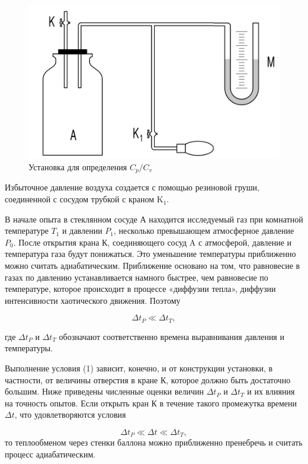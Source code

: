 \documentclass[a4paper,12pt]{article} %
\begin{document}
	\begin{figure}[h!]
		\centering
		\includegraphics[scale = 0.4]{Pictures/Установка.png}
		\caption{Установка для определения $C_{p}/C_{v}$}
	\end{figure}

	
Избыточное давление воздуха создается с помощью резиновой груши, соединенной с сосудом трубкой с краном $\text{K}_{1}$.
	

В начале опыта в стеклянном сосуде А находится исследуемый газ при комнатной температуре $T_{1}$ и давлении $P_{1}$, несколько превышающем атмосферное давление $P_{0}$. После открытия крана К, соединяющего сосуд A с атмосферой, давление и температура газа будут понижаться. Это уменьшение температуры приближенно можно считать адиабатическим. Приближение основано на том, что равновесие в газах по давлению устанавливается намного быстрее, чем равновесие по температуре, которое происходит в процессе «диффузии тепла», диффузии интенсивности хаотического движения. Поэтому
	
	\begin{equation}
		\Delta t_{P} \ll \Delta t_{T},
	\end{equation}

\noindent	где $\Delta t_{P}$ и $\Delta t_{T}$ обозначают соответственно времена выравнивания давления и температуры.

	
 Выполнение условия (1) зависит, конечно, и от конструкции установки, в частности, от величины отверстия в кране К, которое должно быть достаточно большим. Ниже приведены численные оценки величин $\Delta t_{P}$ и $\Delta t_{T}$ и их влияния на точность опытов. Если открыть	кран К в течение такого промежутка времени $\Delta t$, что удовлетворяются условия
	
	\begin{equation}
		\Delta t_{P} \ll \Delta t \ll \Delta t_{T},
	\end{equation}
\noindent то теплообменом через стенки баллона можно приближенно пренебречь и считать процесс адиабатическим.
\end{document}
